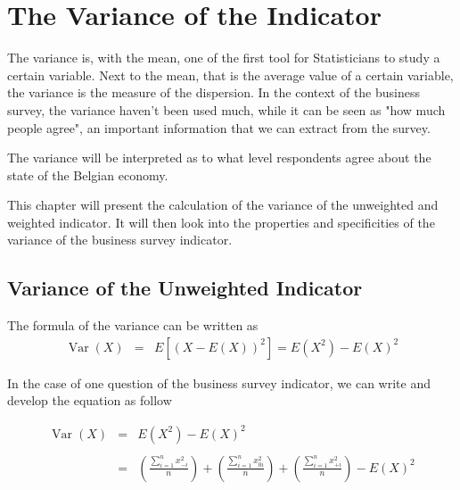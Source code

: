 \documentclass[12pt,a4paper,oneside]{book}
\DeclareMathOperator{\Var}{Var}
\begin{document}
\chapter{The Variance of the Indicator}

The variance is, with the mean, one of the first tool for Statisticians to study a certain variable. Next to the mean, that is the average value of a certain variable, the variance is the measure of the dispersion. 
In the context of the business survey, the variance haven't been used much, while it can be seen as "how much people agree", an important information that we can extract from the survey.

The variance will be interpreted as to what level respondents agree about the state of the Belgian economy.


This chapter will present the calculation of the variance of the unweighted and weighted indicator.
It will then look into the properties and specificities of the variance of the business survey indicator.



\section{Variance of the Unweighted Indicator}


\nocite{alcaniz_calculation_2006}

The formula of the variance can be written as 
\begin{eqnarray}
         \Var(X) &=& E \left[ \left(X-E(X) \right)^2 \right] =  E\left( X^2\right) - E\left( X\right)^2
\end{eqnarray}

In the case of one question of the business survey indicator, we can write and develop the equation as follow

\begin{eqnarray}
\Var(X) &=&  E\left( X^2\right) - E\left( X\right)^2 \nonumber \\ \nonumber \\
    &=& \left( \frac{\sum_{i=1}^n x_{-i}^2}{n} \right) + \left( \frac{\sum_{i=1}^n x_{0i}^2}{n} \right) + \left( \frac{\sum_{i=1}^n x_{+i}^2}{n} \right) - E(X)^2 \\ \nonumber 
\end{eqnarray}
\end{document}
